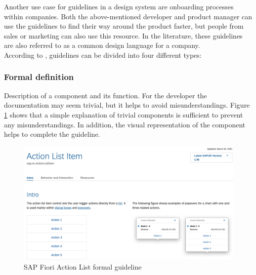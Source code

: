 Another use case for guidelines in a design system are onboarding processes within companies. Both the above-mentioned developer and product manager can use the guidelines to find their way around the product faster, but people from sales or marketing can also use this resource.  In the literature, these guidelines are also referred to as a common design language for a company.  \\
According to \citet*{vesselov_building_2019}, guidelines can be divided into four different types: 


\subsubsection{Formal definition} 
Description of a component and its function. For the developer the documentation may seem trivial, but it helps to avoid misunderstandings. \cite{vesselov_building_2019} Figure \ref{fiori_action_list} shows that a simple explanation of trivial components is sufficient to prevent any misunderstandings. In addition, the visual representation of the component helps to complete the guideline.
\begin{figure}[ht]
\centerline{\includegraphics[width=\linewidth]{images/fiori_action-list_formal.png}}
\caption{SAP Fiori Action List formal guideline \cite{sap_fiori_nodate}}
\label{fiori_action_list}
\end{figure}
\newpage
